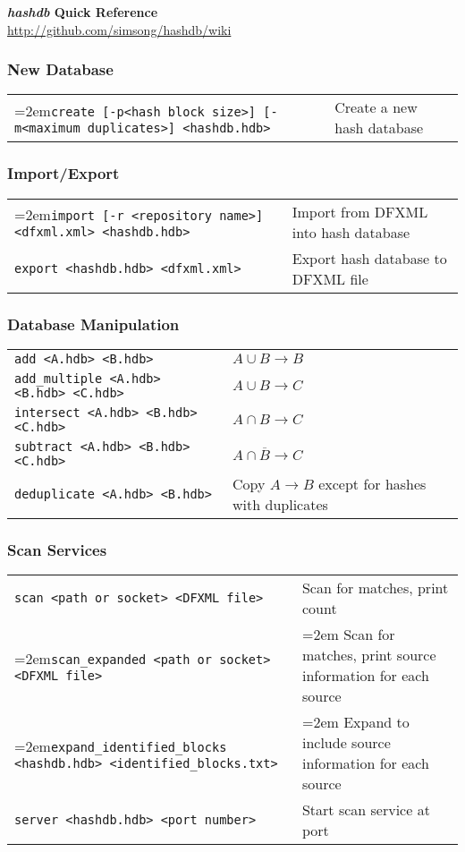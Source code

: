 \documentclass[12pt]{article}
\newcommand{\hdb}{\emph{hashdb}\xspace}
\begin{document}
\begin{center}
\textbf{\Large \hdb Quick Reference} \\
\url{http://github.com/simsong/hashdb/wiki}
\end{center}

\subsubsection*{New Database}
\begin{tabular}{p{8 cm} p{9 cm} }
\hangindent=2em\texttt{create [-p<hash block size>] [-m<maximum duplicates>] <hashdb.hdb>} & Create a new hash database \\
\end{tabular}

\subsubsection*{Import/Export}
\begin{tabular}{p{8 cm} p{9 cm} }
\hangindent=2em\texttt{import [-r <repository name>] <dfxml.xml> <hashdb.hdb>} & Import from DFXML into hash database \\
\texttt{export <hashdb.hdb> <dfxml.xml>} & Export hash database to DFXML file \\
\end{tabular}

\subsubsection*{Database Manipulation}
\begin{tabular}{p{8 cm} p{9 cm} }
\texttt{add <A.hdb> <B.hdb>} & $A \cup B \rightarrow B$ \\
\texttt{add\_multiple <A.hdb> <B.hdb> <C.hdb>} & $A \cup B \rightarrow C$ \\
\texttt{intersect <A.hdb> <B.hdb> <C.hdb>} & $A \cap B \rightarrow C$ \\
\texttt{subtract <A.hdb> <B.hdb> <C.hdb>} & $A \cap \overline B \rightarrow C$ \\
\texttt{deduplicate <A.hdb> <B.hdb>} & Copy $A \rightarrow B$ except for hashes with duplicates \\
\end{tabular}

\subsubsection*{Scan Services}
\begin{tabular}{p{8 cm} p{9 cm} }
\texttt{scan <path or socket> <DFXML file>} & Scan for matches, print count\\
\hangindent=2em\texttt{scan\_expanded <path or socket> <DFXML file>} & \hangindent=2em Scan for matches, print source information for each source \\
\hangindent=2em\texttt{expand\_identified\_blocks <hashdb.hdb> <identified\_blocks.txt>} & \hangindent=2em Expand to include source information for each source \\
\texttt{server <hashdb.hdb> <port number>} & Start scan service at port \\
\end{tabular}
\end{document}
